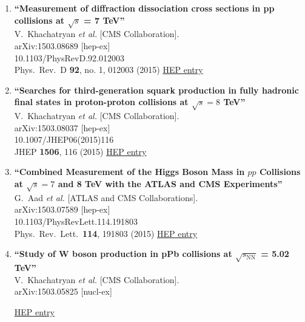 \documentclass{article}
\begin{document}
\begin{enumerate}
\item%
{\bf ``Measurement of diffraction dissociation cross sections in pp collisions at $\sqrt{s}$ = 7 TeV''}
  \\{}V.~Khachatryan {\it et al.} [CMS Collaboration].
  \\{}arXiv:1503.08689 [hep-ex]
    \\{}10.1103/PhysRevD.92.012003
\\{}Phys.\ Rev.\ D {\bf 92}, no. 1, 012003 (2015) %
\href{http://inspirehep.net/record/1356998}{HEP entry}


\item%
{\bf ``Searches for third-generation squark production in fully hadronic final states in proton-proton collisions at $ \sqrt{s} = 8$ TeV''}
  \\{}V.~Khachatryan {\it et al.} [CMS Collaboration].
  \\{}arXiv:1503.08037 [hep-ex]
    \\{}10.1007/JHEP06(2015)116
\\{}JHEP {\bf 1506}, 116 (2015) %
\href{http://inspirehep.net/record/1356728}{HEP entry}


\item%
{\bf ``Combined Measurement of the Higgs Boson Mass in $pp$ Collisions at $\sqrt{s}=7$ and 8 TeV with the ATLAS and CMS Experiments''}
  \\{}G.~Aad {\it et al.} [ATLAS and CMS Collaborations].
  \\{}arXiv:1503.07589 [hep-ex]
    \\{}10.1103/PhysRevLett.114.191803
\\{}Phys.\ Rev.\ Lett.\  {\bf 114}, 191803 (2015) %
\href{http://inspirehep.net/record/1356276}{HEP entry}


\item%
{\bf ``Study of W boson production in pPb collisions at $\sqrt{s_{\mathrm{NN}}}$ = 5.02 TeV''}
  \\{}V.~Khachatryan {\it et al.} [CMS Collaboration].
  \\{}arXiv:1503.05825 [nucl-ex]
  
\href{http://inspirehep.net/record/1353541}{HEP entry}



\end{enumerate}
\end{document}
